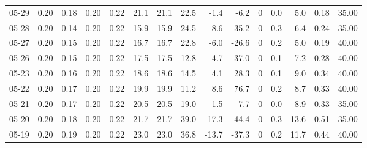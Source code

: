 \begin{threeparttable}
{\begin{tabular}{lrrrrrrrrrrrrrr}
  05-29 &          0.20 &          0.18 &          0.20 &        0.22 &                21.1 &               21.1 &                22.5 &       -1.4 &         -6.2 &              0 &                 0.0 &              5.0 &            0.18 &                  35.00 \\
  05-28 &          0.20 &          0.14 &          0.20 &        0.22 &                15.9 &               15.9 &                24.5 &       -8.6 &        -35.2 &              0 &                 0.3 &              6.4 &            0.24 &                  35.00 \\
  05-27 &          0.20 &          0.15 &          0.20 &        0.22 &                16.7 &               16.7 &                22.8 &       -6.0 &        -26.6 &              0 &                 0.2 &              5.0 &            0.19 &                  40.00 \\
  05-26 &          0.20 &          0.15 &          0.20 &        0.22 &                17.5 &               17.5 &                12.8 &        4.7 &         37.0 &              0 &                 0.1 &              7.2 &            0.28 &                  40.00 \\
  05-23 &          0.20 &          0.16 &          0.20 &        0.22 &                18.6 &               18.6 &                14.5 &        4.1 &         28.3 &              0 &                 0.1 &              9.0 &            0.34 &                  40.00 \\
  05-22 &          0.20 &          0.17 &          0.20 &        0.22 &                19.9 &               19.9 &                11.2 &        8.6 &         76.7 &              0 &                 0.2 &              8.7 &            0.33 &                  40.00 \\
  05-21 &          0.20 &          0.17 &          0.20 &        0.22 &                20.5 &               20.5 &                19.0 &        1.5 &          7.7 &              0 &                 0.0 &              8.9 &            0.33 &                  35.00 \\
  05-20 &          0.20 &          0.18 &          0.20 &        0.22 &                21.7 &               21.7 &                39.0 &      -17.3 &        -44.4 &              0 &                 0.3 &             13.6 &            0.51 &                  35.00 \\
  05-19 &          0.20 &          0.19 &          0.20 &        0.22 &                23.0 &               23.0 &                36.8 &      -13.7 &        -37.3 &              0 &                 0.2 &             11.7 &            0.44 &                  40.00 \\

\end{tabular}}
\end{threeparttable}
